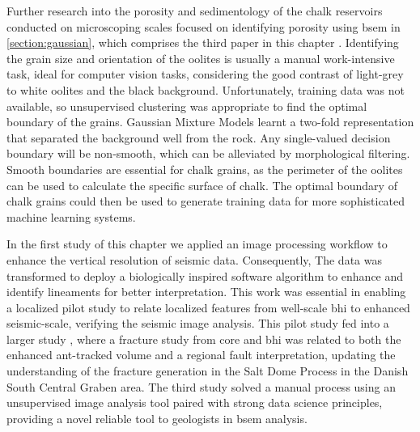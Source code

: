 Further research into the porosity and sedimentology of the chalk reservoirs conducted on microscoping scales focused on identifying porosity using \acf{bsem} in \cref{section:gaussian}, which comprises the third paper in this chapter \citep{dramsch2018gaussian}. Identifying the grain size and orientation of the oolites is usually a manual work-intensive task, ideal for computer vision tasks, considering the good contrast of light-grey to white oolites and the black background. Unfortunately, training data was not available, so unsupervised clustering was appropriate to find the optimal boundary of the grains. Gaussian Mixture Models learnt a two-fold representation that separated the background well from the rock. Any single-valued decision boundary will be non-smooth, which can be alleviated by morphological filtering. Smooth boundaries are essential for chalk grains, as the perimeter of the oolites can be used to calculate the specific surface of chalk. The optimal boundary of chalk grains could then be used to generate training data for more sophisticated machine learning systems.


In the first study of this chapter \citep{aabo2017correlation} we applied an image processing workflow to enhance the vertical resolution of seismic data. Consequently, The data was transformed to deploy a biologically inspired software algorithm to enhance and identify lineaments for better interpretation. This work was essential in enabling a localized pilot study to relate localized features from well-scale \ac{bhi} to enhanced seismic-scale, verifying the seismic image analysis. This pilot study fed into a larger study \citep{aabo2018integrated}, where a fracture study from core and \ac{bhi} was related to both the enhanced ant-tracked volume and a regional fault interpretation, updating the understanding of the fracture generation in the Salt Dome Process in the Danish South Central Graben area. The third study solved a manual process using an unsupervised image analysis tool paired with strong data science principles, providing a novel reliable tool to geologists in \ac{bsem} analysis.